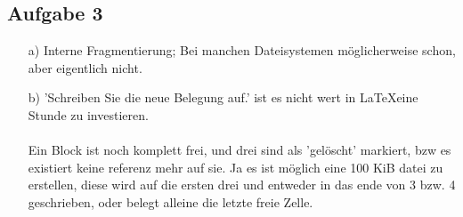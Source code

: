 \documentclass{scrartcl}
\begin{document}
\subsection*{Aufgabe 3}
\begin{itemize}
\item[a)] Interne Fragmentierung; Bei manchen Dateisystemen möglicherweise schon, aber eigentlich nicht.
\item[b)] 'Schreiben Sie die neue Belegung auf.' ist es nicht wert in \LaTeX eine Stunde zu investieren. \\ \\
Ein Block ist noch komplett frei, und drei sind als 'gelöscht' markiert, bzw es existiert keine
referenz mehr auf sie. Ja es ist möglich eine 100 KiB datei zu erstellen,
diese wird auf die ersten drei und entweder in das ende von 3 bzw. 4 geschrieben,
 oder belegt alleine die letzte freie Zelle.

\end{itemize}
\end{document}
